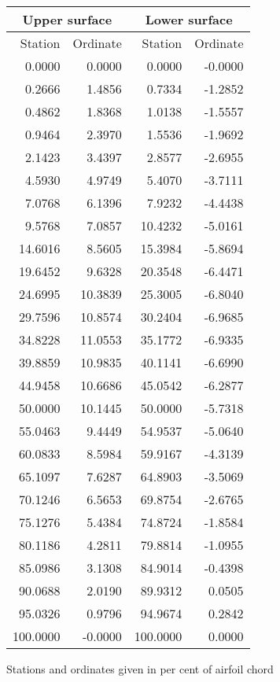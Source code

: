 \documentclass[11pt]{book}
\begin{document}
 \hspace{4mm}
 \begin{tabular}{|r|r|r|r|} \hline 
 \multicolumn{2}{|c|}{Upper surface} & \multicolumn{2}{|c|}{Lower surface} \\
 \hline
 Station & Ordinate & Station & Ordinate \\
 \hline
0.0000 & 0.0000 & 0.0000 & -0.0000 \\
0.2666 & 1.4856 & 0.7334 & -1.2852 \\
0.4862 & 1.8368 & 1.0138 & -1.5557 \\
0.9464 & 2.3970 & 1.5536 & -1.9692 \\
2.1423 & 3.4397 & 2.8577 & -2.6955 \\
4.5930 & 4.9749 & 5.4070 & -3.7111 \\
7.0768 & 6.1396 & 7.9232 & -4.4438 \\
9.5768 & 7.0857 & 10.4232 & -5.0161 \\
14.6016 & 8.5605 & 15.3984 & -5.8694 \\
19.6452 & 9.6328 & 20.3548 & -6.4471 \\
24.6995 & 10.3839 & 25.3005 & -6.8040 \\
29.7596 & 10.8574 & 30.2404 & -6.9685 \\
34.8228 & 11.0553 & 35.1772 & -6.9335 \\
39.8859 & 10.9835 & 40.1141 & -6.6990 \\
44.9458 & 10.6686 & 45.0542 & -6.2877 \\
50.0000 & 10.1445 & 50.0000 & -5.7318 \\
55.0463 & 9.4449 & 54.9537 & -5.0640 \\
60.0833 & 8.5984 & 59.9167 & -4.3139 \\
65.1097 & 7.6287 & 64.8903 & -3.5069 \\
70.1246 & 6.5653 & 69.8754 & -2.6765 \\
75.1276 & 5.4384 & 74.8724 & -1.8584 \\
80.1186 & 4.2811 & 79.8814 & -1.0955 \\
85.0986 & 3.1308 & 84.9014 & -0.4398 \\
90.0688 & 2.0190 & 89.9312 & 0.0505 \\
95.0326 & 0.9796 & 94.9674 & 0.2842 \\
100.0000 & -0.0000 & 100.0000 & 0.0000 \\
 \hline 
 \end{tabular}
 \vspace{8mm}

Stations and ordinates given in per cent of airfoil chord
\end{document}
